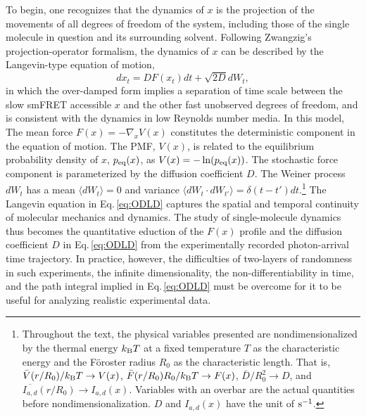 \documentclass[journal=jpcbfk,manuscript=article,layout=twocolumn,articletitle=true]{achemso}
\begin{document}
To begin, one recognizes that the dynamics of $x$ is the projection of the movements of all degrees of freedom of the system, including those of the single molecule in question and its surrounding solvent. Following Zwangzig's projection-operator formalism,\cite{Zwanzig_book_2001} the dynamics of $x$ can be described by the Langevin-type equation of motion,
\begin{equation}
\label{eq:ODLD}
dx_t=D F(x_t)dt  + \sqrt{2D}d{W}_t,
\end{equation}
in which the over-damped form implies a separation of time scale between the slow smFRET accessible $x$ and the other fast unobserved degrees of freedom, and is consistent with the dynamics in low Reynolds number media. In this model, The mean force $F(x)=-\nabla_x V(x)$ constitutes the deterministic component in the equation of motion. The PMF, $V(x)$, is related to the equilibrium probability density of $x$, $p_{\rm{eq}}(x)$, as $V(x) = -\ln(p_{\rm{eq}}(x))$. The stochastic force component is parameterized by the diffusion coefficient $D$. The Weiner process $d{W}_t$ has a mean $\langle d{W}_t \rangle = 0$ and variance $\langle d{W}_t \cdot d{W}_{t'} \rangle = \delta (t-t')dt$.\footnote{Throughout the text, the physical variables presented are nondimensionalized by the thermal energy $k_{\rm{B}}T$ at a fixed temperature $T$ as the characteristic energy and the F\"{o}roster radius $R_0$ as the characteristic length. %
That is, $\bar{V}(r/R_0)/k_{\rm{B}}T  \to V(x)$, $\bar{F}(r/R_0)R_0/k_{\rm{B}}T  \to F(x)$, $\bar{D}/R_0^2 \to D$, and $\overline{I_{a,d}}(r/R_0) \to I_{a,d}(x)$. Variables with an overbar are the actual quantities before nondimensionalization. $D$ and $I_{a,d}(x)$ have the unit of $\rm s^{-1}$.} The Langevin equation in Eq.\,\ref{eq:ODLD} captures the spatial and temporal continuity of molecular mechanics and dynamics. The study of single-molecule dynamics thus becomes the quantitative eduction of the $F(x)$ profile and the diffusion coefficient $D$ in Eq.\,\ref{eq:ODLD} from the experimentally recorded photon-arrival time trajectory. In practice, however, the difficulties of two-layers of randomness in such experiments, the infinite dimensionality, the non-differentiability in time, and the path integral implied in Eq.\,\ref{eq:ODLD} must be overcome for it to be useful for analyzing realistic experimental data.
\end{document}
